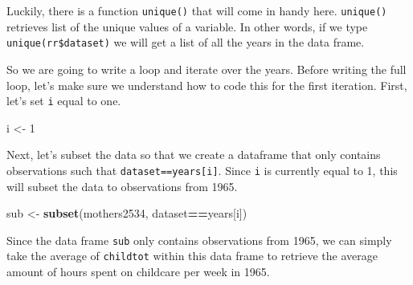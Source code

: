 \documentclass[
]{book}
\newenvironment{Shaded}{\begin{snugshade}}{\end{snugshade}}
\newcommand{\DecValTok}[1]{\textcolor[rgb]{0.00,0.00,0.81}{#1}}
\newcommand{\FloatTok}[1]{\textcolor[rgb]{0.00,0.00,0.81}{#1}}
\newcommand{\FunctionTok}[1]{\textcolor[rgb]{0.13,0.29,0.53}{\textbf{#1}}}
\newcommand{\NormalTok}[1]{#1}
\newcommand{\OtherTok}[1]{\textcolor[rgb]{0.56,0.35,0.01}{#1}}
\newcommand{\SpecialCharTok}[1]{\textcolor[rgb]{0.81,0.36,0.00}{\textbf{#1}}}
\begin{document}
Luckily, there is a function \texttt{unique()} that will come in handy here. \texttt{unique()} retrieves list of the unique values of a variable. In other words, if we type \texttt{unique(rr\$dataset)} we will get a list of all the years in the data frame.

\begin{Shaded}
\end{Shaded}

So we are going to write a loop and iterate over the years. Before writing the full loop, let's make sure we understand how to code this for the first iteration. First, let's set \texttt{i} equal to one.

\begin{Shaded}
\begin{Highlighting}[]
\NormalTok{i }\OtherTok{\textless{}{-}} \DecValTok{1} 
\end{Highlighting}
\end{Shaded}

Next, let's subset the data so that we create a dataframe that only contains observations such that \texttt{dataset==years{[}i{]}}. Since \texttt{i} is currently equal to 1, this will subset the data to observations from 1965.

\begin{Shaded}
\begin{Highlighting}[]
\NormalTok{sub }\OtherTok{\textless{}{-}} \FunctionTok{subset}\NormalTok{(mothers2534, dataset}\SpecialCharTok{==}\NormalTok{years[i])}
\end{Highlighting}
\end{Shaded}

Since the data frame \texttt{sub} only contains observations from 1965, we can simply take the average of \texttt{childtot} within this data frame to retrieve the average amount of hours spent on childcare per week in 1965.

\begin{Shaded}
\end{Shaded}
\end{document}

